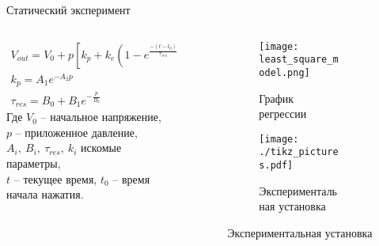 \begin{frame}[t]{Статический эксперимент}
    \begin{columns}[T,onlytextwidth]
        \begin{column}{0.52\textwidth}
            \begin{eqnarray}
                V_{out} = V_0 + p[k_p + k_e(1-e^\frac{-(t-t_0)}{\tau_{res}})](1-e^{-\frac{A}{p}}) \\
                k_p = A_1e^{-A_2p} \\ \tau_{res} = B_0 + B_1e^{-\frac{p}{B_2}}
            \end{eqnarray}
            Где $V_0$ -- начальное напряжение, \\ $p$ -- приложенное давление, \\ $A_i,\ B_i,\ \tau_{res},\ k_i$ искомые параметры, \\  $t$ -- текущее время, $t_0$ -- время начала нажатия.
        \end{column}
        \begin{column}{0.45\textwidth}
            \vspace{-0.5cm}
            \begin{figure}[H]
                \begin{subfigure}{0.99\textwidth}
                    \centering\texttt{[image: least\_square\_model.png]}
                    \caption*{График регрессии}
                \end{subfigure}

                \vspace{-0.3cm}
                \begin{subfigure}{0.99\textwidth}
                    \centering
                    \centering\texttt{[image: ./tikz\_pictures.pdf]}
                    \caption*{Экспериментальная установка}
                \end{subfigure}
            \end{figure}
        \end{column}
    \end{columns}
\end{frame}


